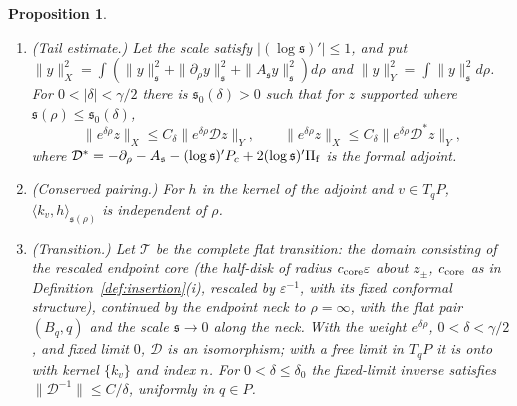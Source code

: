 \documentclass[11pt]{amsart}
\newtheorem{proposition}[theorem]{Proposition}
\theoremstyle{definition}
\theoremstyle{remark}
\theoremstyle{plain}
\numberwithin{equation}{section}
\newcommand{\eps}{\varepsilon}
\begin{document}
\begin{proposition}\label{prop:transition-inverse}
\begin{enumerate}[label=(\roman*)]
\item (Tail estimate.) Let the scale satisfy $|(\log{\mathfrak s})'|\le1$, and put
  $\|y\|_X^2=\int(\|y\|_{\mathfrak s}^2+\|\partial_\rho y\|_{\mathfrak s}^2+\|A_{\mathfrak s} y\|_{\mathfrak s}^2)d\rho$ and
  $\|y\|_Y^2=\int\|y\|_{\mathfrak s}^2d\rho$. For $0<|\delta|<\gamma/2$ there is
  ${\mathfrak s}_0(\delta)>0$ such that for $z$ supported where ${\mathfrak s}(\rho)\le{\mathfrak s}_0(\delta)$,
  \[
  \|e^{\delta\rho}z\|_X\le C_\delta\|e^{\delta\rho}\mathcal Dz\|_Y,\qquad
  \|e^{\delta\rho}z\|_X\le C_\delta\|e^{\delta\rho}\mathcal D^*z\|_Y,
  \]
  where $\mathcal D^*=-\partial_\rho-A_{\mathfrak s}-(\log{\mathfrak s})'P_c+2(\log{\mathfrak s})'\Pi_{\rm f}$ is the formal
  adjoint.
\item (Conserved pairing.) For $h$ in the kernel of the adjoint and $v\in T_qP$,
  $\langle k_v,h\rangle_{{\mathfrak s}(\rho)}$ is independent of $\rho$.
\item (Transition.) Let $\mathcal T$ be the \emph{complete flat transition}: the
  domain consisting of the rescaled endpoint core (the half-disk of radius
  $c_{\rm core}\eps$ about $z_\pm$, $c_{\rm core}$ as in Definition~\ref{def:insertion}(i), rescaled by $\eps^{-1}$, with its fixed conformal
  structure), continued by the endpoint neck to $\rho=\infty$, with the flat
  pair $(B_q,q)$ and the scale ${\mathfrak s}\to0$ along the neck. With the weight
  $e^{\delta\rho}$, $0<\delta<\gamma/2$, and fixed limit $0$, $\mathcal D$ is an isomorphism; with a
  free limit in $T_qP$ it is onto with kernel $\{k_v\}$ and index $n$. For
  $0<\delta\le\delta_0$ the fixed-limit inverse satisfies
  $\|\mathcal D^{-1}\|\le C/\delta$, uniformly in $q\in P$.
\end{enumerate}
\end{proposition}
\end{document}
